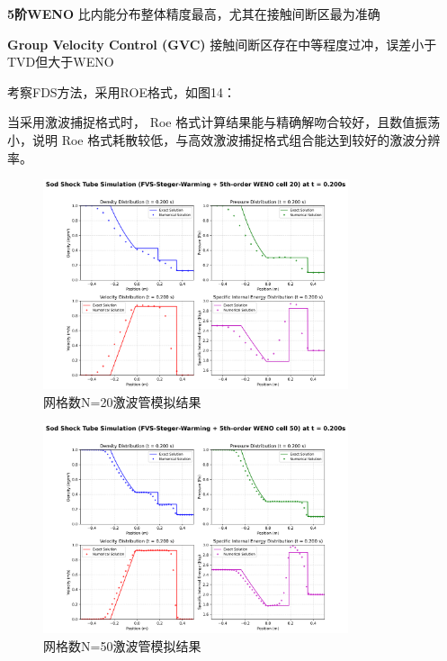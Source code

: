 \documentclass[12pt,a4paper]{article}
\begin{document}
\textbf{5阶WENO} 
比内能分布整体精度最高，尤其在接触间断区最为准确

\textbf{Group Velocity Control (GVC)} 
接触间断区存在中等程度过冲，误差小于TVD但大于WENO

考察FDS方法，采用ROE格式，如图14：

当采用激波捕捉格式时， Roe 格式计算结果能与精确解吻合较好，且数值振荡小，说明 Roe 格式耗散较低，与高效激波捕捉格式组合能达到较好的激波分辨率。

\begin{figure}[!htbp]
    \centering
    \includegraphics[width=0.8\textwidth]{FVS-Steger-Warming + 5th-order WENO cell 20_t_0p200s.png}
    \caption{网格数N=20激波管模拟结果}
\end{figure}
\begin{figure}[!htbp]
    \centering
    \includegraphics[width=0.8\textwidth]{FVS-Steger-Warming + 5th-order WENO cell 50_t_0p200s.png}
    \caption{网格数N=50激波管模拟结果}
\end{figure}
\end{document}

